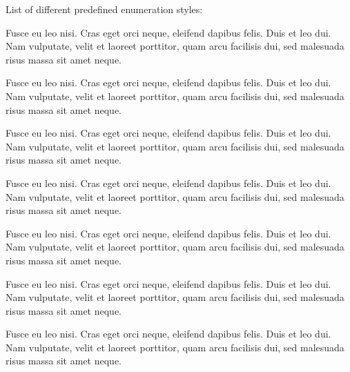 \documentclass[a4paper,ngerman]{tui-algo-seminar}
\begin{document}
List of different predefined enumeration styles:

\begin{theorem}\label{testenv-theorem}
Fusce eu leo nisi. Cras eget orci neque, eleifend dapibus felis. Duis et leo dui. Nam vulputate, velit et laoreet porttitor, quam arcu facilisis dui, sed malesuada risus massa sit amet neque.
\end{theorem}

\begin{lemma}\label{testenv-lemma}
Fusce eu leo nisi. Cras eget orci neque, eleifend dapibus felis. Duis et leo dui. Nam vulputate, velit et laoreet porttitor, quam arcu facilisis dui, sed malesuada risus massa sit amet neque.
\end{lemma}

\begin{corollary}\label{testenv-corollary}
Fusce eu leo nisi. Cras eget orci neque, eleifend dapibus felis. Duis et leo dui. Nam vulputate, velit et laoreet porttitor, quam arcu facilisis dui, sed malesuada risus massa sit amet neque.
\end{corollary}

\begin{proposition}\label{testenv-proposition}
Fusce eu leo nisi. Cras eget orci neque, eleifend dapibus felis. Duis et leo dui. Nam vulputate, velit et laoreet porttitor, quam arcu facilisis dui, sed malesuada risus massa sit amet neque.
\end{proposition}

\begin{conjecture}\label{testenv-conjecture}
Fusce eu leo nisi. Cras eget orci neque, eleifend dapibus felis. Duis et leo dui. Nam vulputate, velit et laoreet porttitor, quam arcu facilisis dui, sed malesuada risus massa sit amet neque.
\end{conjecture}

\begin{observation}\label{testenv-observation}
Fusce eu leo nisi. Cras eget orci neque, eleifend dapibus felis. Duis et leo dui. Nam vulputate, velit et laoreet porttitor, quam arcu facilisis dui, sed malesuada risus massa sit amet neque.
\end{observation}

\begin{exercise}\label{testenv-exercise}
Fusce eu leo nisi. Cras eget orci neque, eleifend dapibus felis. Duis et leo dui. Nam vulputate, velit et laoreet porttitor, quam arcu facilisis dui, sed malesuada risus massa sit amet neque.
\end{exercise}
\end{document}
